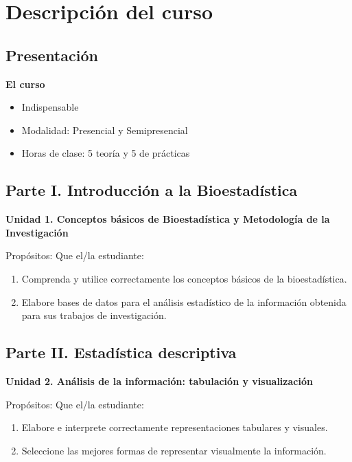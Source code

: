 \section{Descripci\'on del curso}

\subsection{Presentaci\'on}

\textbf{El curso}

\begin{itemize}
    \item Indispensable
    \item Modalidad: Presencial y Semipresencial
    \item Horas de clase: 5 teor\'ia y 5 de pr\'acticas
\end{itemize}

\subsection{Parte I. Introducci\'on a la Bioestad\'istica}

\textbf{Unidad 1. Conceptos b\'asicos de Bioestad\'istica y Metodolog\'ia de la Investigaci\'on}

Prop\'ositos: Que el/la estudiante:
\begin{enumerate}
    \item Comprenda y utilice correctamente los conceptos b\'asicos de la bioestad\'istica.
    \item Elabore bases de datos para el an\'alisis estad\'istico de la informaci\'on obtenida para sus trabajos de investigaci\'on.
\end{enumerate}

\subsection{Parte II. Estad\'istica descriptiva}

\textbf{Unidad 2. An\'alisis de la informaci\'on: tabulaci\'on y visualizaci\'on}

Prop\'ositos: Que el/la estudiante:
\begin{enumerate}
    \item Elabore e interprete correctamente representaciones tabulares y visuales.
    \item Seleccione las mejores formas de representar visualmente la informaci\'on.
\end{enumerate}

